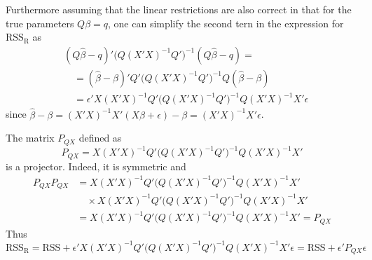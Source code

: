 \documentclass[a4paper]{article}
\newcommand{\R}{\text{R}}
\newcommand{\RSS}{\text{RSS}}
\begin{document}
Furthermore assuming that the linear restrictions are also correct in that for the true parameters $Q\beta = q$, one can simplify the second tern in the expression for $\RSS_\R$ as
\begin{align*}
	&(Q\hat{\beta}-q)'\big(Q(X'X)^{-1}Q'\big)^{-1}(Q\hat{\beta}-q) = \\
	&\quad= (\hat{\beta}-\beta)'Q'\big(Q(X'X)^{-1}Q'\big)^{-1}Q(\hat{\beta}-\beta)\\
	&\quad= \epsilon'X(X'X)^{-1}Q'\big(Q(X'X)^{-1}Q'\big)^{-1}Q(X'X)^{-1}X'\epsilon
\end{align*}
since $\hat{\beta}-\beta = (X'X)^{-1}X'(X\beta + \epsilon) - \beta = (X'X)^{-1}X'\epsilon$.

The matrix $P_{QX}$ defined as 
\[P_{QX} = X(X'X)^{-1}Q'\big(Q(X'X)^{-1}Q'\big)^{-1}Q(X'X)^{-1}X'\]
is a projector. Indeed, it is symmetric and 
\begin{align*}
	P_{QX} P_{QX}
	&= X(X'X)^{-1}Q'\big(Q(X'X)^{-1}Q'\big)^{-1}Q(X'X)^{-1}X'\\
	&\quad\times X(X'X)^{-1}Q'\big(Q(X'X)^{-1}Q'\big)^{-1}Q(X'X)^{-1}X' \\ 
	&= X(X'X)^{-1}Q'\big(Q(X'X)^{-1}Q'\big)^{-1}Q(X'X)^{-1}X' = P_{QX}
\end{align*}
Thus 
\[\RSS_\R = \RSS + \epsilon'X(X'X)^{-1}Q'\big(Q(X'X)^{-1}Q'\big)^{-1}Q(X'X)^{-1}X'\epsilon = \RSS + \epsilon' P_{QX} \epsilon\]
\end{document}
